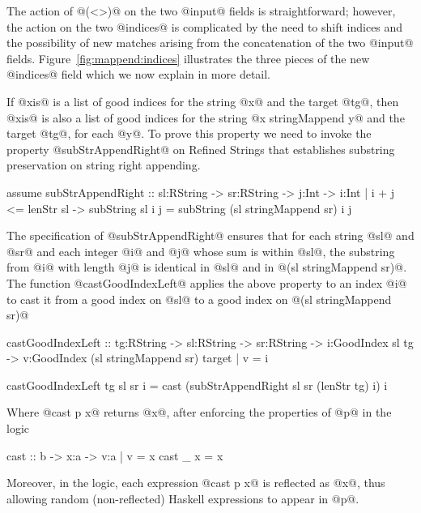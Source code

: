 The action of @(<>)@ on the two @input@ fields is straightforward;
however, the action on the two @indices@ is complicated by the need to
shift indices and the possibility of new matches arising from the
concatenation of the two @input@
fields. Figure~\ref{fig:mappend:indices} illustrates the three pieces
of the new @indices@ field which we now explain in more detail.

If @xis@ is a list of good indices for the string @x@ and the target
@tg@, then @xis@ is also a list of good indices for the string
@x stringMappend y@ and the target @tg@, for each @y@.
%
To prove this property we need to invoke the property
@subStrAppendRight@ on Refined Strings that establishes
substring preservation on string right appending.
%
\begin{code}
  assume subStrAppendRight
      :: sl:RString -> sr:RString -> j:Int
      -> i:{Int | i + j <= lenStr sl }
      -> {subString sl i j = subString (sl stringMappend sr) i j}
\end{code}
%
The specification of @subStrAppendRight@ ensures that for each
string @sl@ and @sr@ and each integer @i@ and @j@ whose sum is within @sl@,
the substring from @i@ with length @j@ is identical in @sl@ and in @(sl stringMappend sr)@.
%
The function @castGoodIndexLeft@ applies the above property to an index @i@
to cast it from a good index on @sl@ to a good index on @(sl stringMappend sr)@
%
\begin{code}
  castGoodIndexLeft
    :: tg:RString -> sl:RString -> sr:RString
    -> i:GoodIndex sl tg
    -> {v:GoodIndex (sl stringMappend sr) target | v = i}

  castGoodIndexLeft tg sl sr i
    = cast (subStrAppendRight sl sr (lenStr tg) i) i
\end{code}
%
Where @cast p x@ returns @x@, after enforcing the properties of @p@ in the logic
\begin{code}
  cast :: b -> x:a -> {v:a | v = x}
  cast _ x = x
\end{code}
%
Moreover, in the logic, each expression @cast p x@
is reflected as @x@,
thus allowing random (\ie non-reflected) Haskell expressions to appear in @p@.

